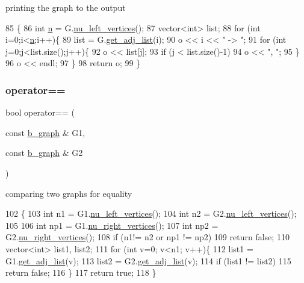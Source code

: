 printing the graph to the output 


\begin{DoxyCode}
85 \{
86   \textcolor{keywordtype}{int} \hyperlink{classb__graph_a9e211d40c1799bc9b125de472ff06642}{n} = G.\hyperlink{classb__graph_a5e71d5c97f2501b0b93c17146cf7e68e}{nu\_left\_vertices}();
87   vector<int> list;
88   \textcolor{keywordflow}{for} (\textcolor{keywordtype}{int} i=0;i<\hyperlink{classb__graph_a9e211d40c1799bc9b125de472ff06642}{n};i++)\{
89     list = G.\hyperlink{classb__graph_aa81c7179b9c6cb4986c4b41e84a85799}{get\_adj\_list}(i);
90     o << i << \textcolor{stringliteral}{" -> "};
91     \textcolor{keywordflow}{for} (\textcolor{keywordtype}{int} j=0;j<list.size();j++)\{
92       o << list[j];
93       \textcolor{keywordflow}{if} (j < list.size()-1)
94         o << \textcolor{stringliteral}{", "};
95     \}
96     o << endl;
97   \}
98   \textcolor{keywordflow}{return} o;
99 \}
\end{DoxyCode}
\mbox{\label{classb__graph_adf87735e8372a81049b347b1fdd23484}} 
\subsubsection{\texorpdfstring{operator==}{operator==}}
{\footnotesize\ttfamily bool operator== (\begin{DoxyParamCaption}\item[{const \hyperlink{classb__graph}{b\+\_\+graph} \&}]{G1,  }\item[{const \hyperlink{classb__graph}{b\+\_\+graph} \&}]{G2 }\end{DoxyParamCaption})\hspace{0.3cm}{\ttfamily [friend]}}



comparing two graphs for equality 


\begin{DoxyCode}
102 \{
103   \textcolor{keywordtype}{int} n1 = G1.\hyperlink{classb__graph_a5e71d5c97f2501b0b93c17146cf7e68e}{nu\_left\_vertices}();
104   \textcolor{keywordtype}{int} n2 = G2.\hyperlink{classb__graph_a5e71d5c97f2501b0b93c17146cf7e68e}{nu\_left\_vertices}();
105   
106   \textcolor{keywordtype}{int} np1 = G1.\hyperlink{classb__graph_abecfd7d6fbd0d9a554fe0d9aa3241a04}{nu\_right\_vertices}();
107   \textcolor{keywordtype}{int} np2 = G2.\hyperlink{classb__graph_abecfd7d6fbd0d9a554fe0d9aa3241a04}{nu\_right\_vertices}();
108   \textcolor{keywordflow}{if} (n1!= n2 or np1 != np2)
109     \textcolor{keywordflow}{return} \textcolor{keyword}{false};
110   vector<int> list1, list2;
111   \textcolor{keywordflow}{for} (\textcolor{keywordtype}{int} v=0; v<n1; v++)\{
112     list1 = G1.\hyperlink{classb__graph_aa81c7179b9c6cb4986c4b41e84a85799}{get\_adj\_list}(v);
113     list2 = G2.\hyperlink{classb__graph_aa81c7179b9c6cb4986c4b41e84a85799}{get\_adj\_list}(v);
114     \textcolor{keywordflow}{if} (list1 != list2)
115       \textcolor{keywordflow}{return} \textcolor{keyword}{false};
116   \}
117   \textcolor{keywordflow}{return} \textcolor{keyword}{true};
118 \}
\end{DoxyCode}


